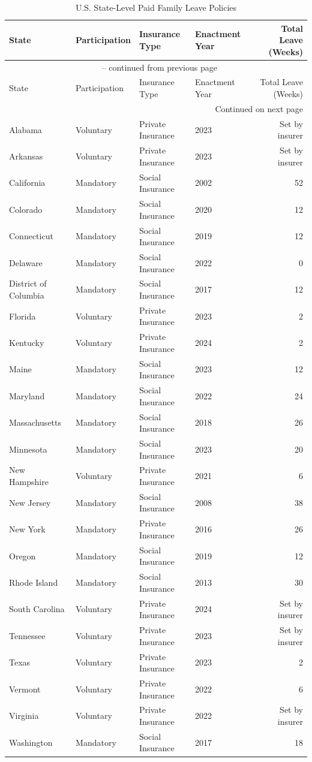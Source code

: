 \begin{longtable}{llllr}
\caption{U.S. State-Level Paid Family Leave Policies}
\label{tab:paid_family_leave} \\

\toprule
State & Participation & Insurance Type & Enactment Year & Total Leave (Weeks) \\
\midrule
\endfirsthead

\multicolumn{5}{c}{{\tablename\ \thetable{} -- continued from previous page}} \\
\toprule
State & Participation & Insurance Type & Enactment Year & Total Leave (Weeks) \\
\midrule
\endhead

\midrule
\multicolumn{5}{r}{{Continued on next page}} \\
\endfoot

\bottomrule
\endlastfoot

Alabama & Voluntary & Private Insurance & 2023 & Set by insurer \\
Arkansas & Voluntary & Private Insurance & 2023 & Set by insurer \\
California & Mandatory & Social Insurance & 2002 & 52 \\
Colorado & Mandatory & Social Insurance & 2020 & 12 \\
Connecticut & Mandatory & Social Insurance & 2019 & 12 \\
Delaware & Mandatory & Social Insurance & 2022 & 0 \\
District of Columbia & Mandatory & Social Insurance & 2017 & 12 \\
Florida & Voluntary & Private Insurance & 2023 & 2 \\
Kentucky & Voluntary & Private Insurance & 2024 & 2 \\
Maine & Mandatory & Social Insurance & 2023 & 12 \\
Maryland & Mandatory & Social Insurance & 2022 & 24 \\
Massachusetts & Mandatory & Social Insurance & 2018 & 26 \\
Minnesota & Mandatory & Social Insurance & 2023 & 20 \\
New Hampshire & Voluntary & Private Insurance & 2021 & 6 \\
New Jersey & Mandatory & Social Insurance & 2008 & 38 \\
New York & Mandatory & Private Insurance & 2016 & 26 \\
Oregon & Mandatory & Social Insurance & 2019 & 12 \\
Rhode Island & Mandatory & Social Insurance & 2013 & 30 \\
South Carolina & Voluntary & Private Insurance & 2024 & Set by insurer \\
Tennessee & Voluntary & Private Insurance & 2023 & Set by insurer \\
Texas & Voluntary & Private Insurance & 2023 & 2 \\
Vermont & Voluntary & Private Insurance & 2022 & 6 \\
Virginia & Voluntary & Private Insurance & 2022 & Set by insurer \\
Washington & Mandatory & Social Insurance & 2017 & 18 \\

\end{longtable}
